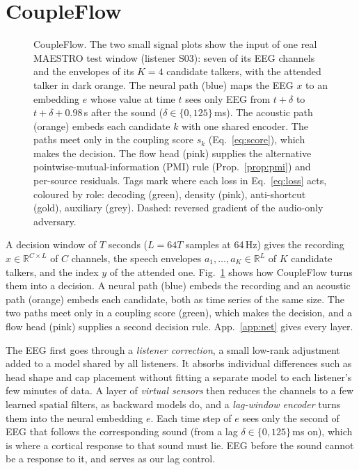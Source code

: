 \documentclass[10pt,twocolumn,letterpaper]{article}
\begin{document}
\section{CoupleFlow}\label{sec:method}
\begin{figure}[!t]\centering
\resizebox{\textwidth}{!}{}
\caption{CoupleFlow. The two small signal plots show the input of one real MAESTRO test
window (listener S03): seven of its EEG channels and the envelopes of its $K=4$ candidate
talkers, with the attended talker in dark orange. The neural path (blue) maps the EEG $x$ to an
embedding $e$ whose value at time $t$ sees only EEG from $t+\delta$ to
$t+\delta+0.98$\,s after the sound ($\delta\in\{0,125\}$\,ms). The acoustic path (orange) embeds each
candidate $k$ with one shared encoder. The paths meet only in the coupling score $s_k$
(Eq.~\ref{eq:score}), which makes the decision. The flow head (pink) supplies the alternative
pointwise-mutual-information (PMI) rule (Prop.~\ref{prop:pmi}) and per-source residuals. Tags mark where each loss in
Eq.~\ref{eq:loss} acts, coloured by role: decoding (green), density (pink), anti-shortcut
(gold), auxiliary (grey). Dashed: reversed gradient of the audio-only adversary.}\label{fig:arch}
\end{figure}
A decision window of $T$ seconds ($L=64T$ samples at 64\,Hz) gives the recording
$x\in\mathbb{R}^{C\times L}$ of $C$ channels, the speech envelopes
$a_1,\dots,a_K\in\mathbb R^{L}$ of $K$ candidate talkers, and the index $y$ of the attended
one. Fig.~\ref{fig:arch} shows how CoupleFlow turns them into a decision. A neural path
(blue) embeds the recording and an acoustic path (orange) embeds each candidate, both as
time series of the same size. The two paths meet only in a coupling score (green), which
makes the decision, and a flow head (pink) supplies a second decision rule.
App.~\ref{app:net} gives every layer.

The EEG first goes through a \emph{listener correction}, a small low-rank adjustment added
to a model shared by all listeners. It absorbs individual differences such as head shape and
cap placement without fitting a separate model to each listener's few minutes of data. A
layer of \emph{virtual sensors} then reduces the channels to a few learned spatial filters,
as backward models do, and a \emph{lag-window encoder} turns them into the neural embedding
$e$. Each time step of $e$ sees only the second of EEG that follows the corresponding sound
(from a lag $\delta\in\{0,125\}$\,ms on), which is where a cortical response to that sound
must lie. EEG before the sound cannot be a response to it, and serves as our lag control.
\end{document}
